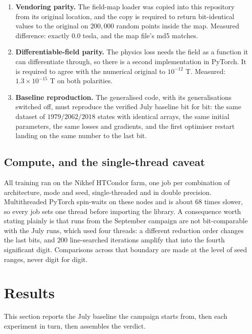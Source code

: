 \documentclass[11pt,a4paper]{article}
\begin{document}
\begin{enumerate}
  \item \textbf{Vendoring parity.} The field-map loader was copied into this
  repository from its original location, and the copy is required to return
  bit-identical values to the original on $200{,}000$ random points inside the
  map. Measured difference: exactly $0.0$ tesla, and the map file's md5 matches.
  \item \textbf{Differentiable-field parity.} The physics loss needs the field
  as a function it can differentiate through, so there is a second
  implementation in PyTorch. It is required to agree with the numerical original
  to $10^{-12}$ T. Measured: $1.3 \times 10^{-15}$ T on both polarities.
  \item \textbf{Baseline reproduction.} The generalised code, with its
  generalisations switched off, must reproduce the verified July baseline bit
  for bit: the same dataset of $1979/2062/2018$ states with identical arrays,
  the same initial parameters, the same losses and gradients, and the first
  optimiser restart landing on the same number to the last bit.
\end{enumerate}

\subsection{Compute, and the single-thread caveat}

All training ran on the Nikhef HTCondor farm, one job per combination of
architecture, mode and seed, single-threaded and in double precision.
Multithreaded PyTorch spin-waits on these nodes and is about $68$ times slower,
so every job sets one thread before importing the library. A consequence worth
stating plainly is that runs from the September campaign are not bit-comparable
with the July runs, which used four threads: a different reduction order changes
the last bits, and $200$ line-searched iterations amplify that into the fourth
significant digit. Comparisons across that boundary are made at the level of
seed ranges, never digit for digit.

\section{Results}
\label{sec:results}

This section reports the July baseline the campaign starts from, then each
experiment in turn, then assembles the verdict.
\end{document}
